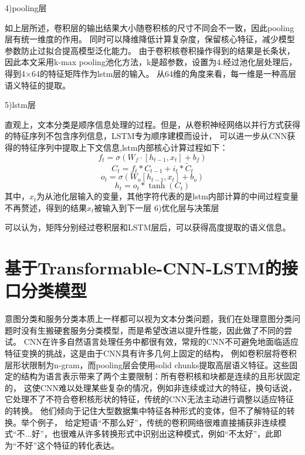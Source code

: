   4)pooling层

    如上层所述，卷积层的输出结果大小随卷积核的尺寸不同会不一致，因此pooling层有统一维度的作用。
    同时可以降维降低计算复杂度，保留核心特征，减少模型参数防止过拟合提高模型泛化能力。
    由于卷积核卷积操作得到的结果是长条状，因此本文采用k-max pooling池化方法，k是超参数，设置为4.经过池化层处理后，得到4×64的特征矩阵作为lstm层的输入。
  从64维的角度来看，每一维是一种高层语义特征的提取。

    5)lstm层

  直观上，文本分类是顺序信息处理的过程。但是，从卷积神经网络以并行方式获得的特征序列不包含序列信息，LSTM专为顺序建模而设计，
  可以进一步从CNN获得的特征序列中提取上下文信息,lstm内部核心计算过程如下：
  \begin{equation}
  f_{t}=σ(W_{f}\cdot[h_{t-1},x_t]+b_{f})
  \end{equation}
  \begin{equation}
    C_{t}=f_{t} * C_{t-1}+i_{t} * \tilde{C}_{t}
    \end{equation} 
    \begin{equation}
      o_{t}=\sigma\left(W_{o}\left[h_{t-1}, x_{t}\right]+b_{o}\right)
    \end{equation} 
    \begin{equation}
      h_{t}=o_{t} * \tanh \left(C_{t}\right)
    \end{equation}
    其中，$x_t$为从池化层输入的变量，其他字符代表的是lstm内部计算的中间过程变量不再赘述，得到的结果$x_t$被输入到下一层
  6)优化层与决策层


可以认为，矩阵分别经过卷积层和LSTM层后，可以获得高度提取的语义信息。



\section{基于Transformable-CNN-LSTM的接口分类模型}
意图分类和服务分类本质上一样都可以视为文本分类问题，我们在处理意图分类问题时没有生搬硬套服务分类模型，而是希望改进以提升性能，因此做了不同的尝试。
CNN在许多自然语言处理任务中都很有效，常规的CNN不可避免地面临适应特征变换的挑战，这是由于CNN具有许多几何上固定的结构，
例如卷积层将卷积层形状限制为n-gram，而pooling层会使用solid chunks提取高层语义特征。这些固定的结构为语言表示带来了两个主要限制：所有卷积核和块都是连续的且形状固定的，
这使CNN难以处理某些复杂的情况，例如非连续或过大的特征，换句话说，它处理不了不符合卷积核形状的特征，传统的CNN无法主动进行调整以适应特征的转换。
他们倾向于记住大型数据集中特征各种形式的变体，但不了解特征的转换。举个例子，
给定短语“不那么好”，传统的卷积网络很难直接捕获非连续模式“不...好”，也很难从许多转换形式中识别出这种模式，例如“不太好”，此即为“不好”这个特征的转化表达。

